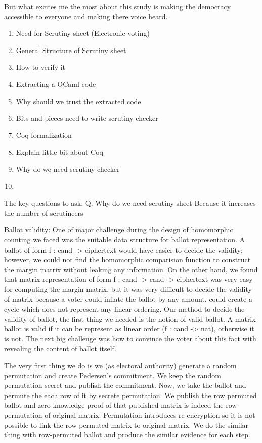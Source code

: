 But what excites me the most about this study is making the democracy accessible to everyone
and making there voice heard. 

\begin{enumerate}
\item Need for Scrutiny sheet (Electronic voting)
\item General Structure of Scrutiny sheet
\item How to verify it
\item Extracting a OCaml code
\item Why should we trust the extracted code
\item Bits and pieces need to write scrutiny checker
\item Coq formalization
\item Explain little bit about Coq
\item Why do we need scrutiny checker
\item 
\end{enumerate}














The key questions to ask: 
Q. Why do we need scrutiny sheet
Because it increases the number of scrutineers 


Ballot validity: 
One of major challenge during the design of homomorphic counting we faced was the suitable data structure for
ballot representation. A ballot of form f : cand -> ciphertext would have easier to decide the validity; however, 
we could not find the homomorphic comparision function to construct the margin matrix without leaking 
any information. On the other hand, we found that matrix representation of form f : cand -> cand -> ciphertext 
was very easy for computing the margin matrix, but it was very difficult to decide the validity of matrix because 
a voter could inflate the ballot by any amount, could create a cycle which does not represent any linear 
ordering. Our method to decide the validity of ballot, the first thing we needed is the notion of valid ballot. 
A matrix ballot is valid if it can be represent as linear order (f : cand -> nat), otherwise it is not. The next 
big challenge was how to convince the voter about this fact with revealing the content of ballot itself. 

The very first thing we do is we (as electoral authority) generate a random permutation and create Pedersen's commitment. 
We keep the random permutation secret and publish the commitment. Now, we take the ballot and permute the each row of 
it by secrete permutation. We publish the row permuted ballot and zero-knowledge-proof of that  
published matrix is indeed the row permutation of original matrix. 
Permutation introduces re-encryption so it is not possible to link the row permuted matrix to 
original matrix. We do the similar thing with row-permuted ballot and produce the similar evidence for 
each step.  



